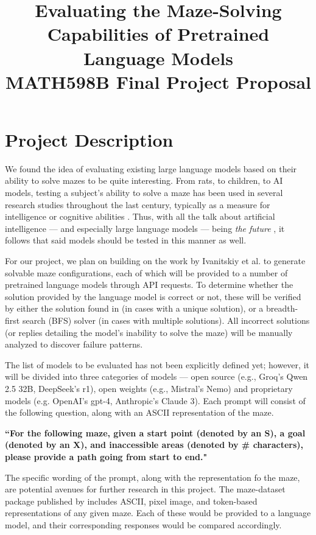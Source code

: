 \documentclass[conference]{IEEEtran}
\title{Evaluating the Maze-Solving Capabilities of Pretrained Language Models\\
{\footnotesize MATH598B Final Project Proposal}}
\author{\IEEEauthorblockN{Gabriel Del Castillo\IEEEauthorrefmark{1}, Nate Webster\IEEEauthorrefmark{2}}
\IEEEauthorblockA{\textit{Department of Computer Science} \\
\textit{Colorado School of Mines}\\
Golden, CO, USA \\
\IEEEauthorrefmark{1}gdelcastillo@mines.edu,
\IEEEauthorrefmark{2}nwebster@mines.edu
}
}
\begin{document}
\maketitle

\section{Project Description}

We found the idea of evaluating existing large language models based on their ability to solve mazes to be quite interesting. From rats, to children, to AI models, testing a subject's ability to solve a maze has been used in several research studies throughout the last century, typically as a measure for intelligence or cognitive abilities \cite{ext1, ext2, ext3}. Thus, with all the talk about artificial intelligence --- and especially large language models --- being \textit{the future} \cite{art1, art2}, it follows that said models should be tested in this manner as well.

For our project, we plan on building on the work by Ivanitskiy et al. \cite{int1} to generate solvable maze configurations, each of which will be provided to a number of pretrained language models through API requests. To determine whether the solution provided by the language model is correct or not, these will be verified by either the solution found in \cite{int1} (in cases with a unique solution), or a breadth-first search (BFS) solver (in cases with multiple solutions). All incorrect solutions (or replies detailing the model's inability to solve the maze) will be manually analyzed to discover failure patterns.

The list of models to be evaluated has not been explicitly defined yet; however, it will be divided into three categories of models --- open source (e.g., Groq's Qwen 2.5 32B, DeepSeek's r1), open weights (e.g., Mistral's Nemo) and proprietary models (e.g. OpenAI's gpt-4, Anthropic's Claude 3). Each prompt will consist of the following question, along with an ASCII representation of the maze.

\begin{center}
\textbf{``For the following maze, given a start point (denoted by an S), a goal (denoted by an X), and inaccessible areas (denoted by \# characters), please provide a path going from start to end."}
\end{center}

The specific wording of the prompt, along with the representation fo the maze, are potential avenues for further research in this project. The maze-dataset package published by \cite{int1} includes ASCII, pixel image, and token-based representations of any given maze. Each of these would be provided to a language model, and their corresponding responses would be compared accordingly.
\end{document}
